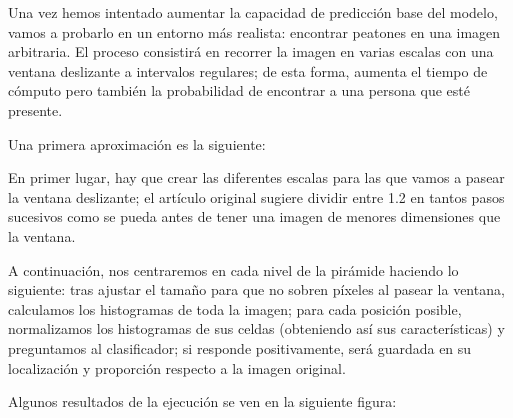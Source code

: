 \documentclass[11pt,a4paper]{article}
\begin{document}
            \par
            Una vez hemos intentado aumentar la capacidad de predicción base del modelo, vamos a probarlo en un entorno más realista: encontrar peatones en una imagen arbitraria. El proceso consistirá en recorrer la imagen en varias escalas con una ventana deslizante a intervalos regulares; de esta forma, aumenta el tiempo de cómputo pero también la probabilidad de encontrar a una persona que esté presente.

            \par
            Una primera aproximación es la siguiente:


            \par
            En primer lugar, hay que crear las diferentes escalas para las que vamos a pasear la ventana deslizante; el artículo original sugiere dividir entre 1.2 en tantos pasos sucesivos como se pueda antes de tener una imagen de menores dimensiones que la ventana.

            \par
            A continuación, nos centraremos en cada nivel de la pirámide haciendo lo siguiente: tras ajustar el tamaño para que no sobren píxeles al pasear la ventana, calculamos los histogramas de toda la imagen; para cada posición posible, normalizamos los histogramas de sus celdas (obteniendo así sus características) y preguntamos al clasificador; si responde positivamente, será guardada en su localización y proporción respecto a la imagen original.

            \par
            Algunos resultados de la ejecución se ven en la siguiente figura:

            \vspace{0.3cm}
\end{document}
